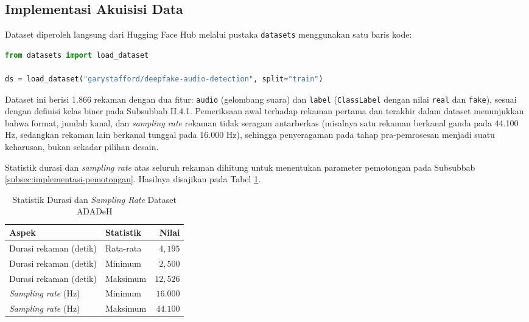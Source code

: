 \subsection{Implementasi Akuisisi Data}
\label{subsec:implementasi-akuisisi}

Dataset diperoleh langsung dari Hugging Face Hub melalui pustaka \texttt{datasets}
menggunakan satu baris kode:

\begin{lstlisting}[language=Python, caption={Akuisisi dataset dari Hugging Face Hub}, label={lst:akuisisi}]
from datasets import load_dataset

ds = load_dataset("garystafford/deepfake-audio-detection", split="train")
\end{lstlisting}

Dataset ini berisi 1.866 rekaman dengan dua fitur: \texttt{audio} (gelombang suara)
dan \texttt{label} (\texttt{ClassLabel} dengan nilai \texttt{real} dan
\texttt{fake}), sesuai dengan definisi kelas biner pada Subsubbab II.4.1.
Pemeriksaan awal terhadap rekaman pertama dan terakhir dalam dataset menunjukkan
bahwa format, jumlah kanal, dan \textit{sampling rate} rekaman tidak seragam
antarberkas (misalnya satu rekaman berkanal ganda pada 44.100 Hz, sedangkan
rekaman lain berkanal tunggal pada 16.000 Hz), sehingga penyeragaman pada tahap
pra-pemrosesan menjadi suatu keharusan, bukan sekadar pilihan desain.

Statistik durasi dan \textit{sampling rate} atas seluruh rekaman dihitung untuk
menentukan parameter pemotongan pada Subsubbab \ref{subsec:implementasi-pemotongan}.
Hasilnya disajikan pada Tabel \ref{tab:statistik-dataset}.

\begin{table}[htbp]
  \centering
  \caption{Statistik Durasi dan \textit{Sampling Rate} Dataset ADADeH}
  \label{tab:statistik-dataset}
  \begin{tabular}{@{}llr@{}}
    \toprule
    \textbf{Aspek} & \textbf{Statistik} & \textbf{Nilai} \\
    \midrule
    Durasi rekaman (detik) & Rata-rata & $4{,}195$ \\
    Durasi rekaman (detik) & Minimum & $2{,}500$ \\
    Durasi rekaman (detik) & Maksimum & $12{,}526$ \\
    \textit{Sampling rate} (Hz) & Minimum & $16.000$ \\
    \textit{Sampling rate} (Hz) & Maksimum & $44.100$ \\
    \bottomrule
  \end{tabular}
\end{table}


